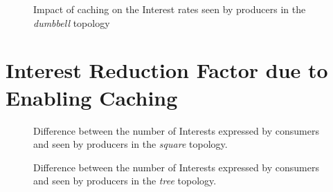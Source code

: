 \begin{appendices}
\begin{figure}[H]
    \centering
    \caption{Impact of caching on the Interest rates seen by producers in the \textit{dumbbell} topology}
\end{figure}

\section{Interest Reduction Factor due to Enabling Caching}
\begin{figure}[H]
    \centering
    \caption{Difference between the number of Interests expressed by consumers and seen by producers in the \textit{square} topology. }
\end{figure}
\begin{figure}[H]
    \centering
    \caption{Difference between the number of Interests expressed by consumers and seen by producers in the \textit{tree} topology. }
\end{figure}

\end{appendices}